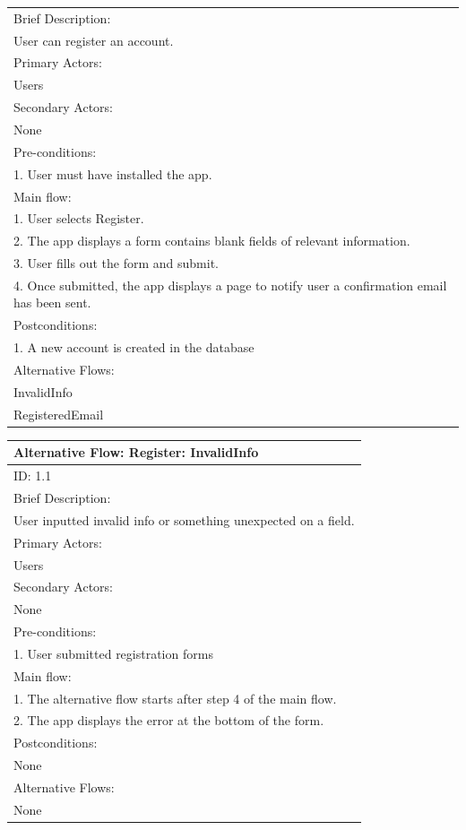 \documentclass{article}
\begin{document}
\begin{flushleft}
\begin{longtable}{ | l |}
\hline
Brief Description:\\ 
User can register an account.\\
\hline
Primary Actors:\\
Users\\
\hline
Secondary Actors:\\
None\\
\hline
Pre-conditions:\\
1. User must have installed the app.\\
\hline
Main flow:\\
1. User selects Register.\\
2. The app displays a form contains blank fields of relevant information.\\
3. User fills out the form and submit.\\
4. Once submitted, the app displays a page to notify user a confirmation email has been sent.\\
\hline
Postconditions:\\
1. A new account is created in the database\\
\hline
Alternative Flows:\\
InvalidInfo\\
RegisteredEmail\\
\hline
\end{longtable}
\begin{longtable}[l]{| l |}
\hline
Alternative Flow: Register: InvalidInfo\\
\hline
ID: 1.1\\
\hline
Brief Description: \\
User inputted invalid info or something unexpected on a field.\\
\hline
Primary Actors:\\
Users\\
\hline
Secondary Actors:\\
None\\
\hline
Pre-conditions:\\
1. User submitted registration forms\\
\hline
Main flow:\\
1. The alternative flow starts after step 4 of the main flow.\\
2. The app displays the error at the bottom of the form.\\
\hline
Postconditions:\\
None\\
\hline
Alternative Flows:\\
None\\

\end{longtable}
\end{flushleft}
\end{document}
